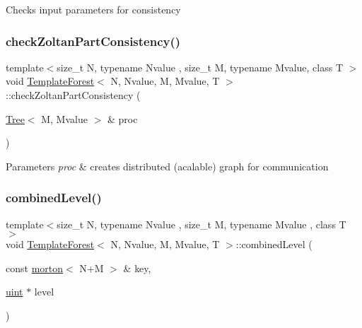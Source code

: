 Checks input parameters for consistency \mbox{\label{classTemplateForest_a6081a7e6c224459b4f6e695a25c04d14}} 
\subsubsection{\texorpdfstring{check\+Zoltan\+Part\+Consistency()}{checkZoltanPartConsistency()}}
{\footnotesize\ttfamily template$<$size\+\_\+t N, typename Nvalue , size\+\_\+t M, typename Mvalue, class T $>$ \\
void \mbox{\hyperlink{classTemplateForest}{Template\+Forest}}$<$ N, Nvalue, M, Mvalue, T $>$\+::check\+Zoltan\+Part\+Consistency (\begin{DoxyParamCaption}\item[{\mbox{\hyperlink{classTree}{Tree}}$<$ M, Mvalue $>$ \&}]{proc }\end{DoxyParamCaption})}


\begin{DoxyParams}{Parameters}
{\em proc} & creates distributed (acalable) graph for communication \\
\hline
\end{DoxyParams}
\mbox{\label{classTemplateForest_a3f0c01310e4f1b71e7d88c0f9e859b4d}} 
\subsubsection{\texorpdfstring{combined\+Level()}{combinedLevel()}}
{\footnotesize\ttfamily template$<$size\+\_\+t N, typename Nvalue , size\+\_\+t M, typename Mvalue , class T $>$ \\
void \mbox{\hyperlink{classTemplateForest}{Template\+Forest}}$<$ N, Nvalue, M, Mvalue, T $>$\+::combined\+Level (\begin{DoxyParamCaption}\item[{const \mbox{\hyperlink{definitions_8h_af8682350bd8bb38ee9023f7a0a310add}{morton}}$<$ N+M $>$ \&}]{key,  }\item[{\mbox{\hyperlink{definitions_8h_a69aa29b598b851b0640aa225a9e5d61d}{uint}} $\ast$}]{level }\end{DoxyParamCaption})}

